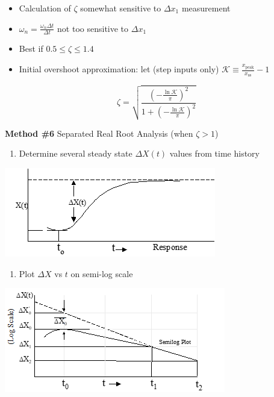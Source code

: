 \documentclass[
]{book}
\providecommand{\tightlist}{%
  \setlength{\itemsep}{0pt}\setlength{\parskip}{0pt}}
\begin{document}
\begin{itemize}
\tightlist
\item
  Calculation of \(\zeta\) somewhat sensitive to \(\Delta x_1\) measurement
\item
  \(\omega_n = \frac{\omega_n \Delta t}{\Delta t}\) not too sensitive to \(\Delta x_1\)
\item
  Best if \(0.5 \leq \zeta \leq 1.4\)
\item
  Initial overshoot approximation: let (step inputs only) \(\mathcal{K} \equiv \frac{x_{\mathrm{peak}}}{x_{\mathrm{ss}}} - 1\)
\end{itemize}

\[
\zeta = \sqrt{\frac{\left( - \frac{\ln \mathcal{K}}{\pi} \right)^2}{1 + \left( - \frac{\ln \mathcal{K}}{\pi} \right)^2}}
\]

\textbf{Method \#6} Separated Real Root Analysis (when \(\zeta > 1\))

\begin{enumerate}
\def\labelenumi{\arabic{enumi}.}
\tightlist
\item
  Determine several steady state \(\Delta X \left(t\right)\) values from time history
\end{enumerate}

\includegraphics{media/08/image84.png}

\begin{enumerate}
\def\labelenumi{\arabic{enumi}.}
\setcounter{enumi}{1}
\tightlist
\item
  Plot \(\Delta X\) vs \(t\) on semi-log scale
\end{enumerate}

\includegraphics{media/08/image85.png}
\end{document}
